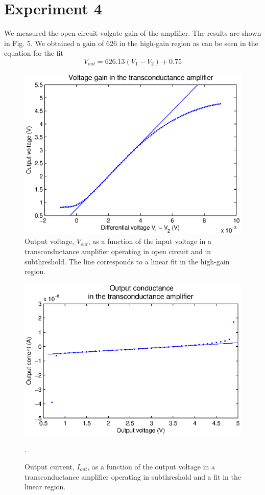 \section{Experiment 4}

We measured the open-circuit volgate gain of the amplifier. The results are shown in Fig. 5. We obtained a gain of \(626\) in the high-gain region as can be seen in the equation for the fit
\begin{equation*}
V_{out}=626.13(V_1-V_2)+0.75
\end{equation*}

\begin{figure}[!htb]
	\center
	\includegraphics{q4a.eps}
	\caption{Output voltage, \(V_{out}\), as a function of the input voltage in a transconductance amplifier operating in open circuit and in subthreshold. The line corresponds to a linear fit in the high-gain region.}
	\label{fig:ex4a}
\end{figure}

\begin{figure}[!htb]
	\center
	\includegraphics{q4b.eps}
	\caption{Output current, \(I_{out}\), as a function of the output voltage in a transconductance amplifier operating in subthreshold and a fit in the linear region.} .
	\label{fig:ex4b}
\end{figure}

